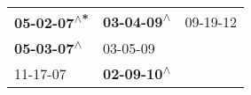 \begin{supertabular}{lll}
 \textbf{05-02-07\textsuperscript{$\wedge$*}} &  \textbf{03-04-09\textsuperscript{$\wedge$}} &  09-19-12\textsuperscript{} \\
  \textbf{05-03-07\textsuperscript{$\wedge$}} &                   03-05-09\textsuperscript{} &                             \\
                   11-17-07\textsuperscript{} &  \textbf{02-09-10\textsuperscript{$\wedge$}} &                             \\
\end{supertabular}
